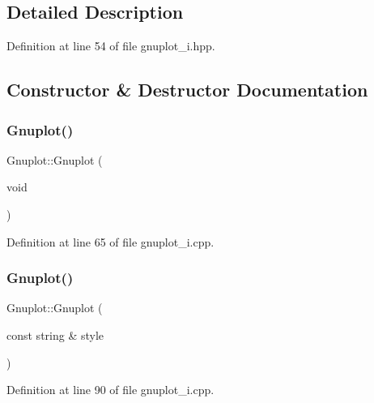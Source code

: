 \subsection{Detailed Description}


Definition at line 54 of file gnuplot\+\_\+i.\+hpp.



\subsection{Constructor \& Destructor Documentation}
\mbox{\label{class_gnuplot_a936d27de7b6f57d1f3d61491dc70f1ae}} 
\subsubsection{\texorpdfstring{Gnuplot()}{Gnuplot()}\hspace{0.1cm}{\footnotesize\ttfamily [1/4]}}
{\footnotesize\ttfamily Gnuplot\+::\+Gnuplot (\begin{DoxyParamCaption}\item[{void}]{ }\end{DoxyParamCaption})}



Definition at line 65 of file gnuplot\+\_\+i.\+cpp.

\mbox{\label{class_gnuplot_a4acdc327a6a9eb3c4ab3f37814dce26e}} 
\subsubsection{\texorpdfstring{Gnuplot()}{Gnuplot()}\hspace{0.1cm}{\footnotesize\ttfamily [2/4]}}
{\footnotesize\ttfamily Gnuplot\+::\+Gnuplot (\begin{DoxyParamCaption}\item[{const string \&}]{style }\end{DoxyParamCaption})}



Definition at line 90 of file gnuplot\+\_\+i.\+cpp.

\mbox{\label{class_gnuplot_a93344aa5bd86c3ee4ab37aaa6bff92e0}} 
